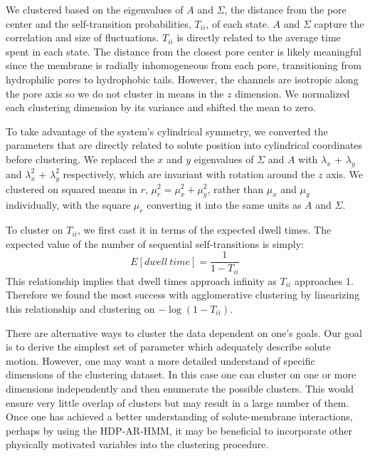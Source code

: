 \documentclass[journal=jpcbfk,manuscript=article]{achemso}
\begin{document}
  We clustered based on the eigenvalues of $A$ and $\Sigma$, the distance from the 
  pore center and the self-transition probabilities, $T_{ii}$, of each state. $A$ 
  and $\Sigma$ capture the correlation and size of fluctuations. $T_{ii}$ is directly
  related to the average time spent in each state. The distance from the closest pore 
  center is likely meaningful since the membrane is radially inhomogeneous from each 
  pore, transitioning from hydrophilic pores to hydrophobic tails. However, the 
  channels are isotropic along the pore axis so we do not cluster in means in the 
  $z$ dimension. We normalized each clustering dimension by its variance and shifted
  the mean to zero.
  
  To take advantage of the system's cylindrical symmetry, we converted the parameters that
  are directly related to solute position into cylindrical coordinates before clustering. 
  We replaced the $x$ and $y$ eigenvalues of $\Sigma$ and $A$ with $\lambda_x$ + 
  $\lambda_y$ and $\lambda_x^2$ + $\lambda_y^2$ respectively, which are invariant with 
  rotation around the $z$ axis. We clustered on squared means in $r$, 
  $\mu_r^2 = \mu_x^2 + \mu_y^2$, rather than $\mu_x$ and $\mu_y$ individually, with the
  square $\mu_r$ converting it into the same units as $A$ and $\Sigma$.

  To cluster on $T_{ii}$, we first cast it in terms of the expected dwell times. The expected
  value of the number of sequential self-transitions is simply:
  \begin{equation}  
   E[dwell~time] = \frac{1}{1 - T_{ii}}
   \label{eqn:dwell_times}
  \end{equation}  
  This relationship implies that dwell times approach infinity as $T_{ii}$ approaches
  1. Therefore we found the most success with agglomerative clustering by linearizing this
  relationship and clustering on $-\log(1 - T_{ii})$.
  
  There are alternative ways to cluster the data dependent on one's goals. Our goal is
  to derive the simplest set of parameter which adequately describe solute motion. 
  However, one may want a more detailed understand of specific dimensions of the 
  clustering dataset. In this case one can cluster on one or more dimensions independently
  and then enumerate the possible clusters. This would ensure very little overlap of
  clusters but may result in a large number of them. Once one has achieved a better 
  understanding of solute-membrane interactions, perhaps by using the HDP-AR-HMM, it may be
  beneficial to incorporate other physically motivated variables into the clustering
  procedure. 
\end{document}
